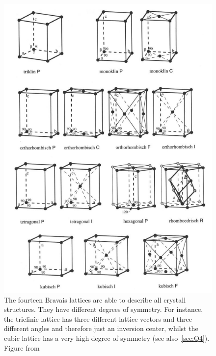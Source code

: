 \begin{figure}[ht]
    \centering
    \includegraphics[width = 0.9\linewidth]{Bilder/Grundlagen/lattices.png}
    \caption{The fourteen Bravais lattices are able to describe all crystall structures. They have different degrees of symmetry. For instance, the triclinic lattice has three different lattice vectors and three different angles and therefore just an inversion center, whilst the cubic lattice has a very high degree of symmetry (see also~\ref{sec:Q4}). Figure from~\cite{Schwarzenbach.2001}}
    \label{fig:bravaisLattices}
\end{figure}